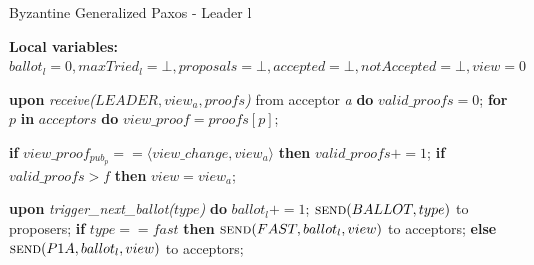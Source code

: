 \begin{algorithm} 
	\caption{Byzantine Generalized Paxos - Leader l}
	\label{BFT-Lead}
	\textbf{Local variables:} $ballot_l = 0,maxTried_l = \bot,proposals = \bot, accepted = \bot, notAccepted = \bot, view = 0$
	\begin{algorithmic}[1]
		\State \textbf{upon} \textit{receive($LEADER,view_a,proofs$)} from acceptor \textit{a} \textbf{do}
		\State \hspace{\algorithmicindent} $valid\_proofs = 0$;
		\State \hspace{\algorithmicindent} \textbf{for} $p$ \textbf{in} $acceptors$ \textbf{do} 
		\State \hspace{\algorithmicindent}\hspace{\algorithmicindent} $view\_proof = proofs[p]$;
		
		\State \hspace{\algorithmicindent}\hspace{\algorithmicindent} \textbf{if} $view\_proof_{pub_p} == \langle view\_change, view_a \rangle$ \textbf{then}
		\State \hspace{\algorithmicindent}\hspace{\algorithmicindent}\hspace{\algorithmicindent}  $valid\_proofs \mathrel{+{=}} 1$;
		\State \hspace{\algorithmicindent} \textbf{if} $valid\_proofs > f$ \textbf{then}
		\State \hspace{\algorithmicindent}\hspace{\algorithmicindent} $view = view_a$;
		
		\State
		\State \textbf{upon} \textit{trigger\_next\_ballot($type$)} \textbf{do}
		\State \hspace{\algorithmicindent} $ballot_l \mathrel{+{=}} 1$;
		\State \hspace{\algorithmicindent} $\Call{send}{BALLOT,type}$ to proposers;
		\State \hspace{\algorithmicindent} \textbf{if} $type == fast$ \textbf{then}
		\State \hspace{\algorithmicindent}\hspace{\algorithmicindent} $\Call{send}{FAST,ballot_l,view}$ to acceptors;
		\State \hspace{\algorithmicindent} \textbf{else}
		\State \hspace{\algorithmicindent}\hspace{\algorithmicindent} $\Call{send}{P1A, ballot_l, view}$ to acceptors;
		

\end{algorithmic}
\end{algorithm}
